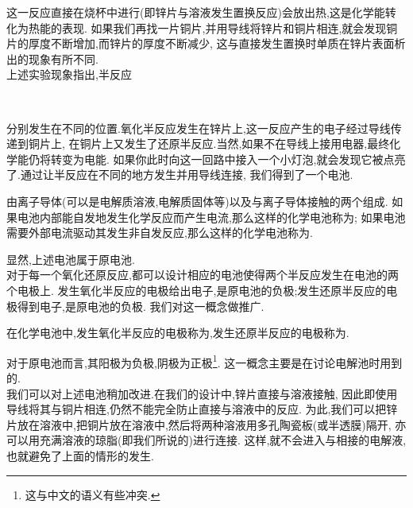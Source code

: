 \documentclass{ctexart}
\begin{document}
这一反应直接在烧杯中进行(即锌片与溶液发生置换反应)会放出热,这是化学能转化为热能的表现.%
如果我们再找一片铜片,并用导线将锌片和铜片相连,就会发现铜片的厚度不断增加,而锌片的厚度不断减少,%
这与直接发生置换时单质在锌片表面析出的现象有所不同.\\
\indent 上述实验现象指出,半反应
\begin{tightcenter}
    \\
\end{tightcenter}
分别发生在不同的位置.氧化半反应发生在锌片上,这一反应产生的电子经过导线传递到铜片上,%
在铜片上又发生了还原半反应.当然,如果不在导线上接用电器,最终化学能仍将转变为电能.%
如果你此时向这一回路中接入一个小灯泡,就会发现它被点亮了.通过让半反应在不同的地方发生并用导线连接,%
我们得到了一个电池.
\begin{definition}[6A.2.1 化学电池]
    由离子导体(可以是电解质溶液,电解质固体等)以及与离子导体接触的两个组成.%
    如果电池内部能自发地发生化学反应而产生电流,那么这样的化学电池称为;%
    如果电池需要外部电流驱动其发生非自发反应,那么这样的化学电池称为.
\end{definition}
显然,上述电池属于原电池.\\
\indent 对于每一个氧化还原反应,都可以设计相应的电池使得两个半反应发生在电池的两个电极上.%
发生氧化半反应的电极给出电子,是原电池的负极;发生还原半反应的电极得到电子,是原电池的负极.%
我们对这一概念做推广.
\begin{definition}[6A.2.2 阳极与阴极]
    在化学电池中,发生氧化半反应的电极称为,发生还原半反应的电极称为.
\end{definition}
对于原电池而言,其阳极为负极,阴极为正极\footnote{这与中文的语义有些冲突.}.%
这一概念主要是在讨论电解池时用到的.\\
\indent 我们可以对上述电池稍加改进.在我们的设计中,锌片直接与溶液接触,%
因此即使用导线将其与铜片相连,仍然不能完全防止直接与溶液中的反应.%
为此,我们可以把锌片放在溶液中,把铜片放在溶液中,然后将两种溶液用多孔陶瓷板(或半透膜)隔开,%
亦可以用充满溶液的琼脂(即我们所说的)进行连接.%
这样,就不会进入与相接的电解液,也就避免了上面的情形的发生.
\end{document}
